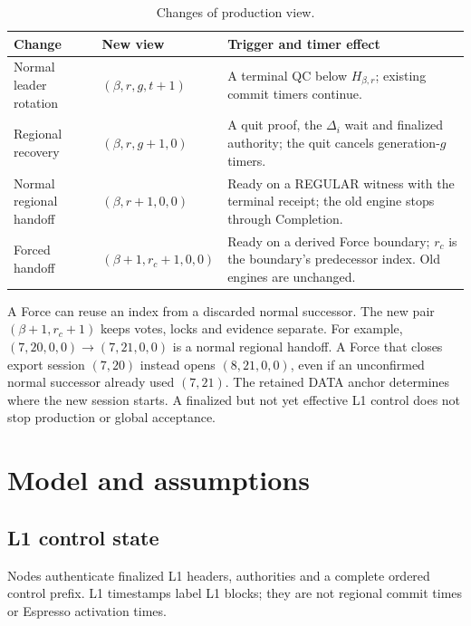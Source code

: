 \documentclass[11pt,a4paper]{article}
\begin{document}
\begin{table}[htbp]\centering\small
\caption{Changes of production view.}\label{tab:views}
\begin{tabularx}{\linewidth}{@{}>{\raggedright\arraybackslash}p{.19\linewidth}>{\raggedright\arraybackslash}p{.25\linewidth}Y@{}}\toprule
Change & New view & Trigger and timer effect\\\midrule
Normal leader rotation & $(\beta,r,g,t+1)$ & A terminal QC below $H_{\beta,r}$;
existing commit timers continue.\\
Regional recovery & $(\beta,r,g+1,0)$ & A quit proof, the $\Delta_i$ wait
and finalized authority; the quit cancels generation-$g$ timers.\\
Normal regional handoff & $(\beta,r+1,0,0)$ & Ready on a REGULAR witness
with the terminal receipt; the old engine stops through Completion.\\
Forced handoff & $(\beta+1,r_c+1,0,0)$ & Ready on a derived Force boundary;
$r_c$ is the boundary's predecessor index. Old engines are unchanged.\\
\bottomrule\end{tabularx}
\end{table}

A Force can reuse an index from a discarded normal successor.
The new pair $(\beta+1,r_c+1)$ keeps votes, locks and evidence separate.
For example, $(7,20,0,0)\to(7,21,0,0)$ is a normal regional
handoff. A Force that closes export session $(7,20)$ instead opens
$(8,21,0,0)$, even if an unconfirmed normal successor already used
$(7,21)$. The retained DATA anchor determines where the new session starts.
A finalized but not yet effective L1 control does not stop production
or global acceptance.

\section{Model and assumptions}
\label{sec:model}
\subsection{L1 control state}
\label{sec:l1}
Nodes authenticate finalized L1 headers, authorities and a complete
ordered control prefix. L1 timestamps label L1 blocks; they are not
regional commit times or Espresso activation times.
\end{document}
